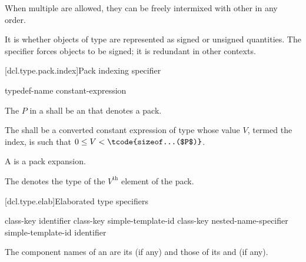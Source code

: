 \pnum
When multiple  are allowed, they can be
freely intermixed with other  in any order.
\begin{note}
It is  whether objects of  type are
represented as signed or unsigned quantities. The  specifier
forces  objects to be signed; it is redundant in other contexts.
\end{note}

[dcl.type.pack.index]{Pack indexing specifier}

\begin{bnf}
\br
    typedef-name  \terminal{[} constant-expression \terminal{]}
\end{bnf}

\pnum
The  $P$ in a 
shall be an  that denotes a pack.

\pnum
The  shall be
a converted constant expression of type 
whose value $V$, termed the index,
is such that $0 \le V < \tcode{sizeof...($P$)}$.

\pnum
A  is a pack expansion.

\pnum
\begin{note}
The  denotes
the type of the $V^\text{th}$ element of the pack.
\end{note}

[dcl.type.elab]{Elaborated type specifiers}%
%
%

\begin{bnf}
\br
    class-key   identifier\br
    class-key simple-template-id\br
    class-key nested-name-specifier  simple-template-id\br
      identifier
\end{bnf}

\pnum
{}%
The component names of an  are
its  (if any) and
those of its  and
 (if any).

